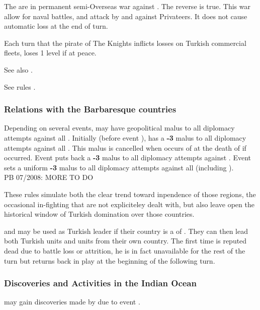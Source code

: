 The  are in permanent semi-Overseas war against
\TUR. The reverse is true. This war allow for naval battles, and attack
by and against Privateers. It does not cause automatic \STAB loss at the
end of turn.

\bparag Each turn that the pirate of The Knights inflicts losses on
Turkish commercial fleets, \TUR loses 1 \STAB level if at peace.

\aparag See also .

 See rules
.


\subsubsection{Relations with the Barbaresque countries}
\aparag Depending on several events, \TUR may have geopolitical malus to
all diplomacy attempts against all \Barbaresques.
\bparag Initially (before event ), \TUR has a {\bf -3} malus to all diplomacy attempts
against all \Barbaresques.
\bparag This malus is cancelled when  occurs of at the death of  if
 occurred.
\bparag Event  puts back a {\bf -3} malus to all
diplomacy attempts against .
\bparag Event  sets a uniform {\bf -3} malus
to all diplomacy attempts against all \Barbaresques (including
).
\\
PB 07/2008: MORE TO DO
\begin{designnote}
These rules simulate both the clear trend toward inpendence of those regions,
the occasional in-fighting that are not expliciteley dealt with, but also leave
open the historical window of Turkish domination over those countries.
\end{designnote}

 and  may be used as Turkish leader if
their country is a \VASSAL of \TUR. They can then lead both Turkish
units and units from their own country.
 The first time  is
reputed dead due to battle loss or attrition, he is in fact unavailable
for the rest of the turn but returns back in play at the beginning of
the following turn.

\subsubsection{Discoveries and Activities in the Indian Ocean}
 \TUR may gain discoveries made
by  due to event .

